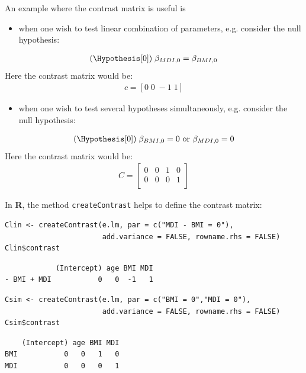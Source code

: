 \documentclass{article}
\newcommand\Rlogo{\textbf{\textsf{R}}}
\begin{document}
An example where the contrast matrix is useful is
\begin{itemize}
\item when one wish to test linear combination of parameters,
e.g. consider the null hypothesis:
\end{itemize}
\begin{align*}
(\Hypothesis[0]) \; \beta_{MDI,0} = \beta_{BMI,0}
\end{align*}
Here the contrast matrix would be:
\begin{align*}
c=[0 \; 0 \; -1 \; 1]
\end{align*}
\begin{itemize}
\item when one wish to test several hypotheses simultaneously,
e.g. consider the null hypothesis:
\end{itemize}
\begin{align*}
(\Hypothesis[0]) \; \beta_{BMI,0} = 0 \text{ or } \beta_{MDI,0} = 0 \\
\end{align*}
Here the contrast matrix would be:
\begin{align*}
C = \begin{bmatrix}
0 & 0 & 1 & 0 \\
0 & 0 & 0 & 1 \\
\end{bmatrix}
\end{align*}

In \Rlogo{}, the method \texttt{createContrast} helps to define the contrast
matrix:
\lstset{language=r,label= ,caption= ,captionpos=b,numbers=none}
\begin{lstlisting}
Clin <- createContrast(e.lm, par = c("MDI - BMI = 0"),
					   add.variance = FALSE, rowname.rhs = FALSE)
Clin$contrast
\end{lstlisting}

\begin{verbatim}
            (Intercept) age BMI MDI
- BMI + MDI           0   0  -1   1
\end{verbatim}

\lstset{language=r,label= ,caption= ,captionpos=b,numbers=none}
\begin{lstlisting}
Csim <- createContrast(e.lm, par = c("BMI = 0","MDI = 0"),
					   add.variance = FALSE, rowname.rhs = FALSE)
Csim$contrast
\end{lstlisting}

\begin{verbatim}
    (Intercept) age BMI MDI
BMI           0   0   1   0
MDI           0   0   0   1
\end{verbatim}
\end{document}
